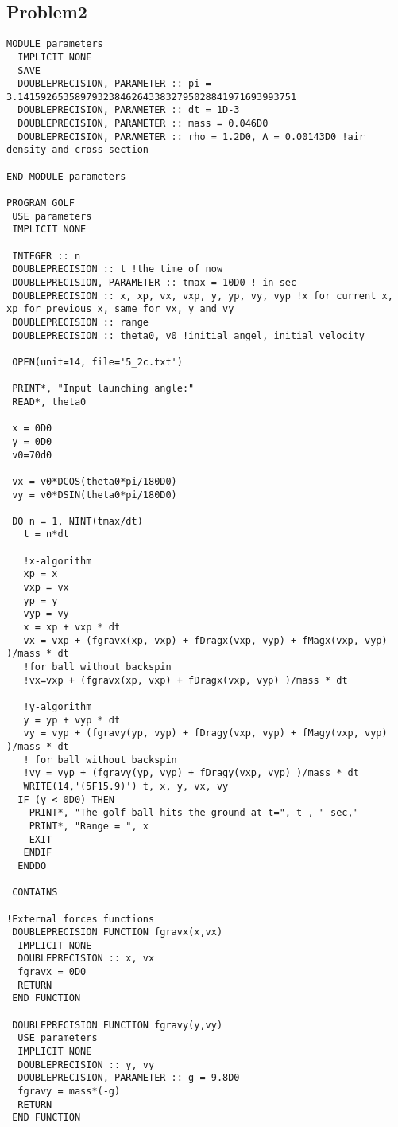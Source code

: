 \documentclass{article}
\begin{document}
\subsection*{Problem2}
 \begin{verbatim}
MODULE parameters 
  IMPLICIT NONE
  SAVE
  DOUBLEPRECISION, PARAMETER :: pi = 3.1415926535897932384626433832795028841971693993751
  DOUBLEPRECISION, PARAMETER :: dt = 1D-3
  DOUBLEPRECISION, PARAMETER :: mass = 0.046D0
  DOUBLEPRECISION, PARAMETER :: rho = 1.2D0, A = 0.00143D0 !air density and cross section
 
END MODULE parameters          

PROGRAM GOLF
 USE parameters
 IMPLICIT NONE

 INTEGER :: n 
 DOUBLEPRECISION :: t !the time of now
 DOUBLEPRECISION, PARAMETER :: tmax = 10D0 ! in sec
 DOUBLEPRECISION :: x, xp, vx, vxp, y, yp, vy, vyp !x for current x, xp for previous x, same for vx, y and vy
 DOUBLEPRECISION :: range 
 DOUBLEPRECISION :: theta0, v0 !initial angel, initial velocity

 OPEN(unit=14, file='5_2c.txt')

 PRINT*, "Input launching angle:"
 READ*, theta0

 x = 0D0
 y = 0D0
 v0=70d0

 vx = v0*DCOS(theta0*pi/180D0)
 vy = v0*DSIN(theta0*pi/180D0)
 
 DO n = 1, NINT(tmax/dt)
   t = n*dt 

   !x-algorithm
   xp = x
   vxp = vx
   yp = y
   vyp = vy
   x = xp + vxp * dt
   vx = vxp + (fgravx(xp, vxp) + fDragx(vxp, vyp) + fMagx(vxp, vyp) )/mass * dt
   !for ball without backspin
   !vx=vxp + (fgravx(xp, vxp) + fDragx(vxp, vyp) )/mass * dt

   !y-algorithm
   y = yp + vyp * dt
   vy = vyp + (fgravy(yp, vyp) + fDragy(vxp, vyp) + fMagy(vxp, vyp) )/mass * dt
   ! for ball without backspin
   !vy = vyp + (fgravy(yp, vyp) + fDragy(vxp, vyp) )/mass * dt 
   WRITE(14,'(5F15.9)') t, x, y, vx, vy
  IF (y < 0D0) THEN
    PRINT*, "The golf ball hits the ground at t=", t , " sec,"
	PRINT*, "Range = ", x
    EXIT
   ENDIF
  ENDDO

 CONTAINS

!External forces functions
 DOUBLEPRECISION FUNCTION fgravx(x,vx)
  IMPLICIT NONE
  DOUBLEPRECISION :: x, vx
  fgravx = 0D0
  RETURN
 END FUNCTION

 DOUBLEPRECISION FUNCTION fgravy(y,vy)
  USE parameters
  IMPLICIT NONE
  DOUBLEPRECISION :: y, vy
  DOUBLEPRECISION, PARAMETER :: g = 9.8D0
  fgravy = mass*(-g)
  RETURN
 END FUNCTION
 

\end{verbatim}
\end{document}
